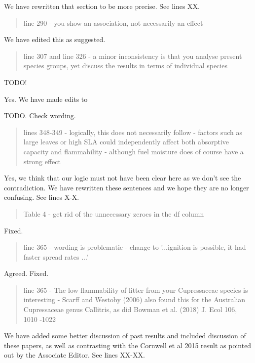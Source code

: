 \documentclass[letterpaper, 12pt]{letter}
\begin{document}
\begin{letter}{}
We have rewritten that section to be more precise.  See lines XX.

\begin{quote}
line 290 - you show an association, not necessarily an effect
\end{quote}

We have edited this as suggested.

\begin{quote}
line 307 and line 326 - a minor inconsistency is that you analyse present species groups, yet discuss the results in terms of individual species
\end{quote}

TODO!

Yes. We have made edits to

TODO. Check wording.



\begin{quote}
lines 348-349 - logically, this does not necessarily follow - factors such as large leaves or high SLA could independently affect both absorptive capacity and flammability - although fuel moisture does of course have a strong effect 
\end{quote}

Yes, we think that our logic must not have been clear here as we don't see the contradiction. We  have rewritten these sentences and we hope they are no longer confusing. See lines X-X.


\begin{quote}
Table 4 - get rid of the unnecessary zeroes in the df column
\end{quote}

Fixed.

\begin{quote}
line 365 - wording is problematic - change to '...ignition is possible, it had faster spread rates ...'
\end{quote}

Agreed. Fixed. 

\begin{quote}
line 365 - The low flammability of litter from your Cupressaceae species is interesting - Scarff and Westoby (2006) also found this for the Australian Cupressaceae genus Callitris, as did Bowman et al. (2018) J. Ecol 106, 1010 -1022
\end{quote}

We have added some better discussion of past results and included discussion of these papers, as well as contrasting with the Cornwell et al 2015 result as pointed out by the Associate Editor. See lines XX-XX.


\end{letter}
\end{document}
